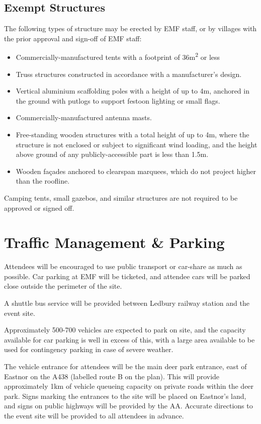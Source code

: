 \subsection{Exempt Structures}

The following types of structure may be erected by EMF staff, or by villages
with the prior approval and sign-off of EMF staff:

\begin{itemize}
    \tightlist
    \item Commercially-manufactured tents with a footprint of 36m\textsuperscript{2} or less
    \item Truss structures constructed in accordance with a manufacturer's design.
    \item Vertical aluminium scaffolding poles with a height of up to 4m, anchored in the
          ground with putlogs to support festoon lighting or small flags.
    \item Commercially-manufactured antenna masts.
    \item Free-standing wooden structures with a total height of up to 4m, where the
          structure is not enclosed or subject to significant wind loading, and the height above
          ground of any publicly-accessible part is less than 1.5m.
    \item Wooden façades anchored to clearspan marquees, which do not project higher than the roofline.
\end{itemize}

Camping tents, small gazebos, and similar structures are not required to be approved or signed off.

\section{Traffic Management \& Parking}

Attendees will be encouraged to use public transport or car-share as much as
possible. Car parking at EMF will be ticketed, and attendee cars will be
parked close outside the perimeter of the site.

A shuttle bus service will be provided between Ledbury railway station and the event
site.

Approximately 500-700 vehicles are expected to park on site, and the capacity
available for car parking is well in excess of this, with a large area available
to be used for contingency parking in case of severe weather.

The vehicle entrance for attendees will be the main deer park entrance, east of
Eastnor on the A438 (labelled route B on the plan). This will provide
approximately 1km of vehicle queueing capacity on private roads within the deer
park. Signs marking the entrances to the site will be placed on Eastnor's land, and
signs on public highways will be provided by the AA\@. Accurate directions to
the event site will be provided to all attendees in advance.


